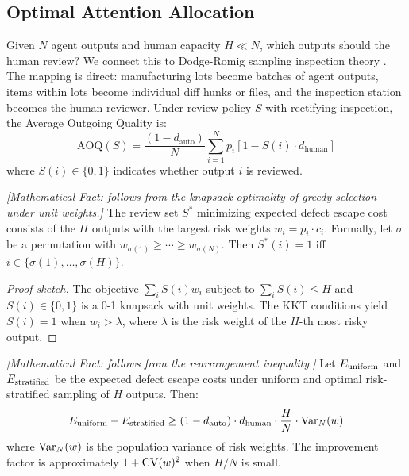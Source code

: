 \subsection{Optimal Attention Allocation}

Given $N$ agent outputs and human capacity $H \ll N$, which outputs should the human review? We connect this to Dodge-Romig sampling inspection theory \citep{dodge1929method, dodge1959sampling}. The mapping is direct: manufacturing lots become batches of agent outputs, items within lots become individual diff hunks or files, and the inspection station becomes the human reviewer. Under review policy $S$ with rectifying inspection, the Average Outgoing Quality is:
\begin{equation}
\text{AOQ}(S) = \frac{(1 - d_{\text{auto}})}{N} \sum_{i=1}^{N} p_i \left[1 - S(i) \cdot d_{\text{human}}\right]
\end{equation}
where $S(i) \in \{0,1\}$ indicates whether output $i$ is reviewed.

\begin{theorem}
\emph{[Mathematical Fact: follows from the knapsack optimality of greedy selection under unit weights.]}
\label{thm:optimal-triage}
The review set $S^*$ minimizing expected defect escape cost consists of the $H$ outputs with the largest risk weights $w_i = p_i \cdot c_i$. Formally, let $\sigma$ be a permutation with $w_{\sigma(1)} \geq \cdots \geq w_{\sigma(N)}$. Then $S^*(i) = 1$ iff $i \in \{\sigma(1), \ldots, \sigma(H)\}$.
\end{theorem}

\begin{proof}[Proof sketch]
The objective $\sum_i S(i) w_i$ subject to $\sum_i S(i) \leq H$ and $S(i) \in \{0,1\}$ is a 0-1 knapsack with unit weights. The KKT conditions yield $S(i) = 1$ when $w_i > \lambda$, where $\lambda$ is the risk weight of the $H$-th most risky output.
\end{proof}

\begin{theorem}
\emph{[Mathematical Fact: follows from the rearrangement inequality.]}
\label{thm:stratification}
Let $E_{\textup{uniform}}$ and $E_{\textup{stratified}}$ be the expected defect escape costs under uniform and optimal risk-stratified sampling of $H$ outputs. Then:
\begin{equation}
E_{\textup{uniform}} - E_{\textup{stratified}} \geq (1 - d_{\textup{auto}}) \cdot d_{\textup{human}} \cdot \frac{H}{N} \cdot \textup{Var}_N(w)
\end{equation}
where $\textup{Var}_N(w)$ is the population variance of risk weights. The improvement factor is approximately $1 + \textup{CV}(w)^2$ when $H/N$ is small.
\end{theorem}

